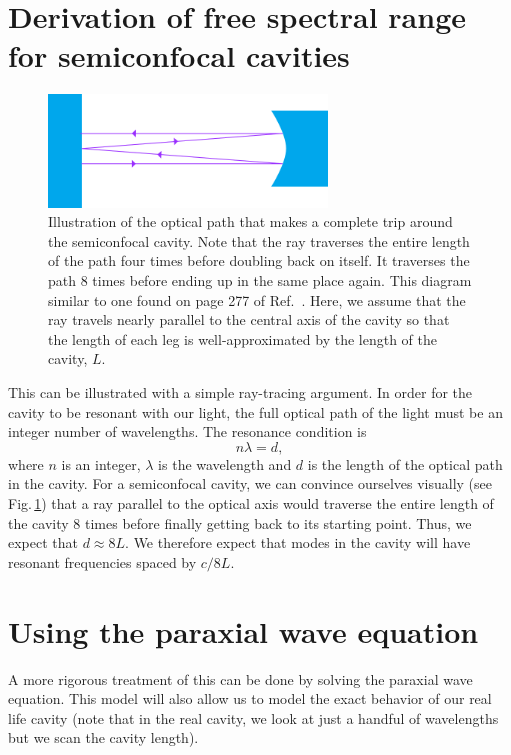 \section{Derivation of free spectral range for semiconfocal cavities}
\begin{figure}
\centerline{\includegraphics[height=3cm]{spectrum_analyzer_path.png}}
\caption[Spectrum analyzer ray path illustration]{\label{completePath}Illustration of the optical path that makes a complete trip around the semiconfocal cavity. Note that the ray traverses the entire length of the path four times before doubling back on itself. It traverses the path 8 times before ending up in the same place again. This diagram similar to one found on page 277 of Ref.\ \cite{lasersMilonniEberly}. Here, we assume that the ray travels nearly parallel to the central axis of the cavity so that the length of each leg is well-approximated by the length of the cavity, $L$.}
\end{figure}

This can be illustrated with a simple ray-tracing argument. 
In order for the cavity to be resonant with our light, the full optical path of the light must be an integer number of wavelengths. The resonance condition is 
\begin{equation}
n \lambda = d,
\end{equation}
where $n$ is an integer, $\lambda$ is the wavelength and $d$ is the length of the optical path in the cavity. 
For a semiconfocal cavity, we can convince ourselves visually (see Fig.\,\ref{completePath}) that a ray parallel to the optical axis would traverse the entire length of the cavity 8 times before finally getting back to its starting point. Thus, we expect that $d\approx 8L$.
We therefore expect that modes in the cavity will have resonant frequencies spaced by $c/8L$. 

\section{Using the paraxial wave equation}

A more rigorous treatment of this can be done by solving the paraxial wave equation. This model will also allow us to model the exact behavior of our real life cavity (note that in the real cavity, we look at just a handful of wavelengths but we scan the cavity length).

